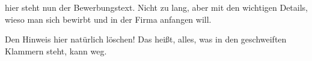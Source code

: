 \documentclass[12pt,parskip=half-]{scrartcl}
\begin{document}





\begin{Anschreiben}
    hier steht nun der Bewerbungstext. Nicht zu lang, aber mit den
    wichtigen Details, wieso man sich bewirbt und in der Firma
    anfangen will.
    
    Den Hinweis hier natürlich löschen! Das heißt, alles, was in
    den geschweiften Klammern steht, kann weg.
\end{Anschreiben}


\MeineSeite
\clearpage

\end{document}
